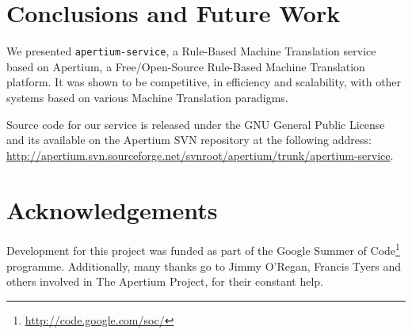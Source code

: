 \documentclass[11pt]{article}
\begin{document}
\section{Conclusions and Future Work}

We presented {\tt apertium-service}, a Rule-Based Machine Translation service based on Apertium, a Free/Open-Source Rule-Based Machine Translation platform. It was shown to be competitive, in efficiency and scalability, with other systems based on various Machine Translation paradigms. 


Source code for our service is released under the GNU General Public License and its available on the Apertium SVN repository at the following address: \url{http://apertium.svn.sourceforge.net/svnroot/apertium/trunk/apertium-service}.

\section*{Acknowledgements}

Development for this project was funded as part of the Google Summer of Code\footnote{\url{http://code.google.com/soc/}} programme.
Additionally, many thanks go to Jimmy O'Regan, Francis Tyers and others involved in The Apertium Project, for their constant help.




\end{document}
